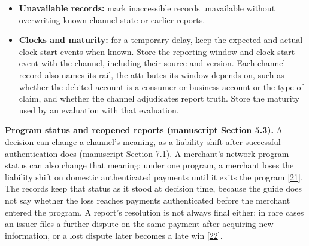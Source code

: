 \documentclass[
  11pt,
]{article}
\begin{document}
\begin{itemize}
  \textbf{No report:} an open channel remains pending before its
  reporting window ends. It matures with no report only if it stayed
  open throughout the window and the records cover that window. If a
  recorded decision or rule event changed the channel's meaning, the
  matured absence carries that decision's ID, or the rule event's source
  and version, and is read under the changed meaning, not as a negative
  for the original outcome. A channel with no defined window never
  supports a negative by maturity alone. A matured absence is
  provisional: it records the rule version under which it matured and
  returns to pending if a later rule event reopens the window.
\item
  \textbf{Unavailable records:} mark inaccessible records unavailable
  without overwriting known channel state or earlier reports.
\item
  \textbf{Clocks and maturity:} for a temporary delay, keep the expected
  and actual clock-start events when known. Store the reporting window
  and clock-start event with the channel, including their source and
  version. Each channel record also names its rail, the attributes its
  window depends on, such as whether the debited account is a consumer
  or business account or the type of claim, and whether the channel
  adjudicates report truth. Store the maturity used by an evaluation
  with that evaluation.
\end{itemize}

\textbf{Program status and reopened reports (manuscript Section 5.3).} A
decision can change a channel's meaning, as a liability shift after
successful authentication does (manuscript Section 7.1). A merchant's
network program status can also change that meaning: under one program,
a merchant loses the liability shift on domestic authenticated payments
until it exits the program
{[}\protect\hyperlink{ref-Stripe2026MonitoringPrograms}{21}{]}. The
records keep that status as it stood at decision time, because the guide
does not say whether the loss reaches payments authenticated before the
merchant entered the program. A report's resolution is not always final
either: in rare cases an issuer files a further dispute on the same
payment after acquiring new information, or a lost dispute later becomes
a late win {[}\protect\hyperlink{ref-Stripe2026Disputes}{22}{]}.
\end{document}
